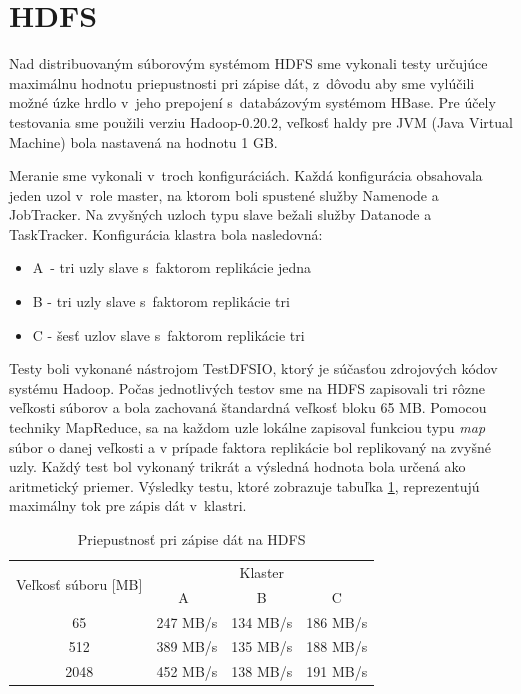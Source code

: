 \documentclass[11pt,twoside,a4paper]{book}
\begin{document}
\section{HDFS}
Nad distribuovaným súborovým systémom HDFS sme vykonali testy určujúce maximálnu hodnotu priepustnosti pri zápise dát, z~dôvodu aby sme vylúčili možné úzke hrdlo v~jeho prepojení s~databázovým systémom HBase. Pre účely testovania sme použili verziu Hadoop-0.20.2, veľkosť haldy pre JVM (Java Virtual Machine) bola nastavená na hodnotu 1 GB.

Meranie sme vykonali v~troch konfiguráciách. Každá konfigurácia obsahovala jeden uzol v~role master, na ktorom boli spustené služby Namenode a JobTracker. Na zvyšných uzloch typu slave bežali služby Datanode a TaskTracker. Konfigurácia klastra bola nasledovná:

\begin{itemize}
 \item A~- tri uzly slave s~faktorom replikácie jedna
 \item B - tri uzly slave s~faktorom replikácie tri
 \item C - šesť uzlov slave s~faktorom replikácie tri
\end{itemize}

Testy boli vykonané nástrojom TestDFSIO, ktorý je súčasťou zdrojových kódov systému Hadoop. Počas jednotlivých testov sme na HDFS zapisovali tri rôzne veľkosti súborov a bola zachovaná štandardná veľkosť bloku 65 MB. Pomocou techniky MapReduce, sa na každom uzle lokálne zapisoval funkciou typu \emph{map} súbor o danej veľkosti a v prípade faktora replikácie bol replikovaný na zvyšné uzly.  Každý test bol vykonaný trikrát a výsledná hodnota bola určená ako aritmetický priemer. Výsledky testu, ktoré zobrazuje tabuľka \ref{tab:HDFSperformance}, reprezentujú maximálny tok pre zápis dát v~klastri.

\begin{table}[hp]
\begin{center}
\begin{tabular}{|c|c|c|c|}
\hline 
\multirow{2}{*}{Veľkosť súboru [MB]} & \multicolumn{3}{|c|}{Klaster}  \\

& A~& B & C\\
\hline 65 & 247 MB/s& 134 MB/s& 186 MB/s\\ 
\hline 512 & 389 MB/s& 135 MB/s& 188 MB/s\\ 
\hline 2048 & 452 MB/s& 138 MB/s& 191 MB/s\\ 
\hline
\end{tabular} 
\end{center}
\caption{Priepustnosť pri zápise dát na HDFS}
\label{tab:HDFSperformance}
\end{table}
\end{document}
